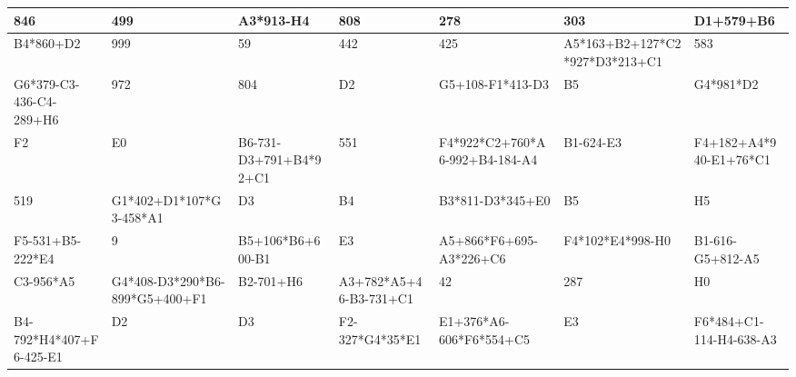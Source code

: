 \tiny
\begin{center}
\begin{tabular}{ | l | l | l | l | l | l | l |}
\hline
846 & 499 & A3*913-H4 & 808 & 278 & 303 & D1+579+B6 \\
\hline
B4*860+D2 & 999 & 59 & 442 & 425 & A5*163+B2+127*C2*927*D3*213+C1 & 583 \\
\hline
G6*379-C3-436-C4-289+H6 & 972 & 804 & D2 & G5+108-F1*413-D3 & B5 & G4*981*D2 \\
\hline
F2 & E0 & B6-731-D3+791+B4*92+C1 & 551 & F4*922*C2+760*A6-992+B4-184-A4 & B1-624-E3 & F4+182+A4*940-E1+76*C1 \\
\hline
519 & G1*402+D1*107*G3-458*A1 & D3 & B4 & B3*811-D3*345+E0 & B5 & H5 \\
\hline
F5-531+B5-222*E4 & 9 & B5+106*B6+600-B1 & E3 & A5+866*F6+695-A3*226+C6 & F4*102*E4*998-H0 & B1-616-G5+812-A5 \\
\hline
C3-956*A5 & G4*408-D3*290*B6-899*G5+400+F1 & B2-701+H6 & A3+782*A5+46-B3-731+C1 & 42 & 287 & H0 \\
\hline
B4-792*H4*407+F6-425-E1 & D2 & D3 & F2-327*G4*35*E1 & E1+376*A6-606*F6*554+C5 & E3 & F6*484+C1-114-H4-638-A3 \\
\hline
\end{tabular}
\end{center}
\normalsize

